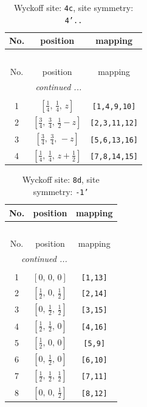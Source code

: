 \documentclass[fleqn,8pt]{jsarticle}
\begin{document}
\renewcommand{\arraystretch}{1.2}
\begin{longtable}{ccc}
\caption{Wyckoff site: {\tt 4c}, site symmetry: {\tt 4'..}}
 \\
 \hline \hline
No. & position & mapping \\ \hline \endfirsthead

\multicolumn{2}{l}{\tablename\ \thetable{}} \\
 \hline \hline
No. & position & mapping \\ \hline \endhead

 \hline \hline
\multicolumn{2}{r}{\footnotesize\it continued ...} \\ \endfoot

 \hline \hline
\multicolumn{2}{r}{} \\ \endlastfoot

1 & $\left[ \frac{1}{4},\, \frac{1}{4},\, z \right]$ & {\tt [1,4,9,10]} \\ \hline
2 & $\left[ \frac{3}{4},\, \frac{3}{4},\, \frac{1}{2} - z \right]$ & {\tt [2,3,11,12]} \\ \hline
3 & $\left[ \frac{3}{4},\, \frac{3}{4},\, - z \right]$ & {\tt [5,6,13,16]} \\ \hline
4 & $\left[ \frac{1}{4},\, \frac{1}{4},\, z + \frac{1}{2} \right]$ & {\tt [7,8,14,15]} \\
\end{longtable}
\renewcommand{\arraystretch}{1.2}
\begin{longtable}{ccc}
\caption{Wyckoff site: {\tt 8d}, site symmetry: {\tt -1'}}
 \\
 \hline \hline
No. & position & mapping \\ \hline \endfirsthead

\multicolumn{2}{l}{\tablename\ \thetable{}} \\
 \hline \hline
No. & position & mapping \\ \hline \endhead

 \hline \hline
\multicolumn{2}{r}{\footnotesize\it continued ...} \\ \endfoot

 \hline \hline
\multicolumn{2}{r}{} \\ \endlastfoot

1 & $\left[ 0,\, 0,\, 0 \right]$ & {\tt [1,13]} \\ \hline
2 & $\left[ \frac{1}{2},\, 0,\, \frac{1}{2} \right]$ & {\tt [2,14]} \\ \hline
3 & $\left[ 0,\, \frac{1}{2},\, \frac{1}{2} \right]$ & {\tt [3,15]} \\ \hline
4 & $\left[ \frac{1}{2},\, \frac{1}{2},\, 0 \right]$ & {\tt [4,16]} \\ \hline
5 & $\left[ \frac{1}{2},\, 0,\, 0 \right]$ & {\tt [5,9]} \\ \hline
6 & $\left[ 0,\, \frac{1}{2},\, 0 \right]$ & {\tt [6,10]} \\ \hline
7 & $\left[ \frac{1}{2},\, \frac{1}{2},\, \frac{1}{2} \right]$ & {\tt [7,11]} \\ \hline
8 & $\left[ 0,\, 0,\, \frac{1}{2} \right]$ & {\tt [8,12]} \\
\end{longtable}
\end{document}
